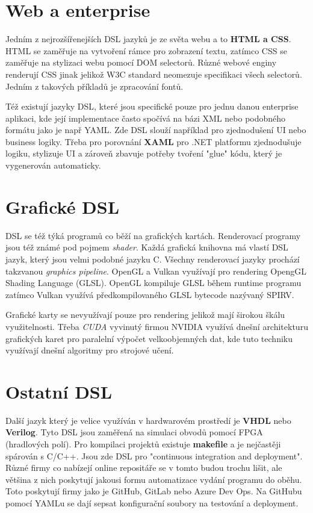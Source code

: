 \documentclass[male,czech]{kithesis}
\begin{document}
\section{Web a enterprise}
Jedním z nejrozšířenejších DSL jazyků je ze světa webu a to \textbf{HTML a CSS}. 
HTML se zaměřuje na vytvoření rámce pro zobrazení textu,
zatímco CSS se zaměřuje na stylizaci webu pomocí DOM selectorů. 
Různé webové enginy renderují CSS jinak jelikož W3C standard neomezuje specifikaci
všech selectorů.
Jedním z takových příkladů je zpracování fontů.

Též existují jazyky DSL, 
které jsou specifické pouze pro jednu danou enterprise aplikaci, 
kde její implementace často spočívá na bázi XML nebo podobného formátu jako je např YAML. 
Zde DSL slouží například pro zjednodušení UI nebo business logiky. 
Třeba pro porovnání \textbf{XAML} pro .NET platformu zjednodušuje logiku, 
stylizuje UI a zároveň zbavuje potřeby tvoření "glue" kódu, 
který je vygenerován automaticky.

\section{Grafické DSL}
DSL se též týká programů co běží na grafických kartách. 
Renderovací programy jsou též známé pod pojmem \textit{shader}.
Každá grafická knihovna má vlastí DSL jazyk, 
který jsou velmi podobné jazyku C.
Všechny renderovací jazyky prochází takzvanou \textit{graphics pipeline}. 
OpenGL a Vulkan využívají pro rendering OpengGL Shading Language (GLSL). 
OpenGL kompiluje GLSL během runtime 
programu zatímco Vulkan využívá předkompilovaného GLSL bytecode nazývaný SPIRV.

Grafické karty se nevyužívají pouze pro rendering jelikož mají širokou škálu
využitelnosti. 
Třeba \textit{CUDA} vyvinutý firmou NVIDIA 
využívá dnešní architekturu grafických karet pro paralelní výpočet 
velkoobjemných dat, kde tuto techniku využívají dnešní algoritmy pro 
strojové učení. 

\section{Ostatní DSL}
Další jazyk který je velice využíván v hardwarovém prostředí je \textbf{VHDL} nebo \textbf{Verilog}. 
Tyto DSL jsou zaměřená na simulaci obvodů pomocí FPGA (hradlových polí). 
Pro kompilaci projektů existuje \textbf{makefile} a je nejčastěji spárován s C/C++. 
Jsou zde DSL pro "continuous integration and deployment". 
Různé firmy co nabízejí online repositáře se v tomto budou trochu lišit, 
ale většina z nich poskytují jakousi formu automatizace vydání programu do oběhu.
Toto poskytují firmy jako je GitHub,
GitLab nebo Azure Dev Ops. 
Na GitHubu pomocí YAMLu se dají sepsat konfigurační soubory 
na testování a deployment.
\end{document}

